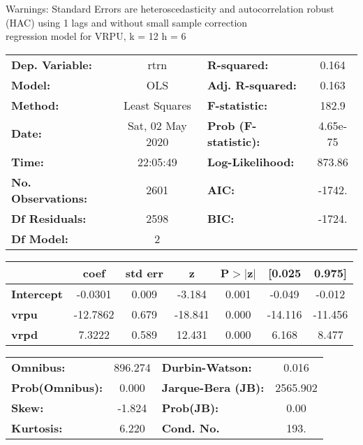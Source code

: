 Warnings: \newline
 [1] Standard Errors are heteroscedasticity and autocorrelation robust (HAC) using 1 lags and without small sample correction\\ 

regression model for VRPU, k = 12 h = 6\begin{center}
\begin{tabular}{lclc}
\toprule
\textbf{Dep. Variable:}    &       rtrn       & \textbf{  R-squared:         } &     0.164   \\
\textbf{Model:}            &       OLS        & \textbf{  Adj. R-squared:    } &     0.163   \\
\textbf{Method:}           &  Least Squares   & \textbf{  F-statistic:       } &     182.9   \\
\textbf{Date:}             & Sat, 02 May 2020 & \textbf{  Prob (F-statistic):} &  4.65e-75   \\
\textbf{Time:}             &     22:05:49     & \textbf{  Log-Likelihood:    } &    873.86   \\
\textbf{No. Observations:} &        2601      & \textbf{  AIC:               } &    -1742.   \\
\textbf{Df Residuals:}     &        2598      & \textbf{  BIC:               } &    -1724.   \\
\textbf{Df Model:}         &           2      & \textbf{                     } &             \\
\bottomrule
\end{tabular}
\begin{tabular}{lcccccc}
                   & \textbf{coef} & \textbf{std err} & \textbf{z} & \textbf{P$> |$z$|$} & \textbf{[0.025} & \textbf{0.975]}  \\
\midrule
\textbf{Intercept} &      -0.0301  &        0.009     &    -3.184  &         0.001        &       -0.049    &       -0.012     \\
\textbf{vrpu}      &     -12.7862  &        0.679     &   -18.841  &         0.000        &      -14.116    &      -11.456     \\
\textbf{vrpd}      &       7.3222  &        0.589     &    12.431  &         0.000        &        6.168    &        8.477     \\
\bottomrule
\end{tabular}
\begin{tabular}{lclc}
\textbf{Omnibus:}       & 896.274 & \textbf{  Durbin-Watson:     } &    0.016  \\
\textbf{Prob(Omnibus):} &   0.000 & \textbf{  Jarque-Bera (JB):  } & 2565.902  \\
\textbf{Skew:}          &  -1.824 & \textbf{  Prob(JB):          } &     0.00  \\
\textbf{Kurtosis:}      &   6.220 & \textbf{  Cond. No.          } &     193.  \\
\bottomrule
\end{tabular}
\end{center}

